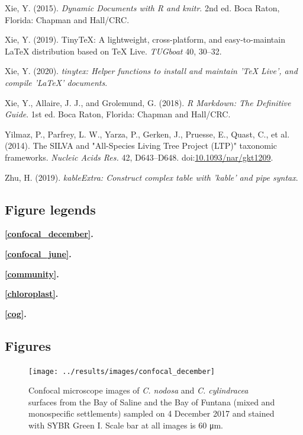 \documentclass[12pt,]{article}
\begin{document}
\leavevmode\hypertarget{ref-Xie2015}{}%
Xie, Y. (2015). \emph{Dynamic Documents with R and knitr}. 2nd ed. Boca
Raton, Florida: Chapman and Hall/CRC.

\leavevmode\hypertarget{ref-Xie2019a}{}%
Xie, Y. (2019). TinyTeX: A lightweight, cross-platform, and
easy-to-maintain LaTeX distribution based on TeX Live. \emph{TUGboat}
40, 30--32.

\leavevmode\hypertarget{ref-Xie2020}{}%
Xie, Y. (2020). \emph{tinytex: Helper functions to install and maintain
'TeX Live', and compile 'LaTeX' documents}.

\leavevmode\hypertarget{ref-Xie2018}{}%
Xie, Y., Allaire, J. J., and Grolemund, G. (2018). \emph{R Markdown: The
Definitive Guide}. 1st ed. Boca Raton, Florida: Chapman and Hall/CRC.

\leavevmode\hypertarget{ref-Yilmaz2014}{}%
Yilmaz, P., Parfrey, L. W., Yarza, P., Gerken, J., Pruesse, E., Quast,
C., et al. (2014). The SILVA and "All-Species Living Tree Project (LTP)"
taxonomic frameworks. \emph{Nucleic Acids Res.} 42, D643--D648.
doi:\href{https://doi.org/10.1093/nar/gkt1209}{10.1093/nar/gkt1209}.

\leavevmode\hypertarget{ref-Zhu2019}{}%
Zhu, H. (2019). \emph{kableExtra: Construct complex table with 'kable'
and pipe syntax}.

\newpage 
\setlength\parindent{0pt}

\hypertarget{figure-legends}{%
\subsection{Figure legends}\label{figure-legends}}

\textbf{\autoref{confocal_december}.} 

\textbf{\autoref{confocal_june}.} 

\textbf{\autoref{community}.} 

\textbf{\autoref{chloroplast}.} 

\textbf{\autoref{cog}.} 

\newpage

\hypertarget{figures}{%
\subsection{Figures}\label{figures}}

\begin{figure}[ht]

{\centering \texttt{[image: ../results/images/confocal\_december]} 

}

\caption{Confocal microscope images of \textit{C. nodosa} and \textit{C. cylindracea} surfaces from the Bay of Saline and the Bay of Funtana (mixed and monospecific settlements) sampled on 4 December 2017 and stained with SYBR Green I. Scale bar at all images is 60 \si{\um}.\label{confocal_december}}\label{fig:unnamed-chunk-1}
\end{figure}
\end{document}
